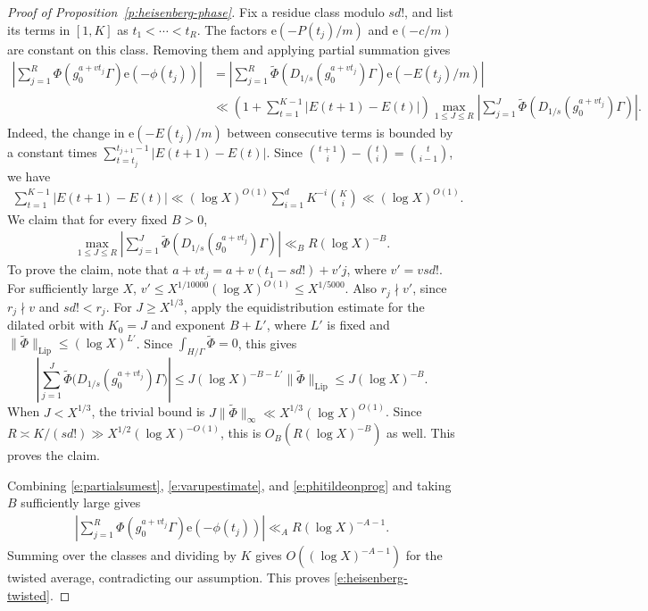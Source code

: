 \documentclass[12pt]{amsart}
\newcommand{\1}{\mathbf 1}
\newcommand{\e}{\mathrm e}
\theoremstyle{definition}
\begin{document}
\begin{proof}[Proof of Proposition~\ref{p:heisenberg-phase}]
Fix a residue class modulo \(sd!\), and list its terms in
\([1,K]\) as \(t_1<\cdots<t_R\). The factors \(\e(-P(t_j)/m)\)
and \(\e(-c/m)\) are constant on this class. Removing them and
applying partial summation gives
\begin{align}\label{e:partialsumest}
 \left|\sum_{j=1}^R
   \Phi(g_0^{a+vt_j}\Gamma)\e(-\phi(t_j))\right|
 &=\left|\sum_{j=1}^R
   \widetilde\Phi(D_{1/s}(g_0^{a+vt_j})\Gamma)
   \e(-E(t_j)/m)\right|\\
 &\ll
 \left(1+\sum_{t=1}^{K-1}|E(t+1)-E(t)|\right)
 \max_{1\leq J\leq R}
 \left|\sum_{j=1}^J
   \widetilde\Phi(D_{1/s}(g_0^{a+vt_j})\Gamma)\right|\nonumber.
\end{align}
Indeed, the change in \(\e(-E(t_j)/m)\) between consecutive terms
is bounded by a constant times
\(\sum_{t=t_j}^{t_{j+1}-1}|E(t+1)-E(t)|\). Since
\(\binom{t+1}{i}-\binom{t}{i}=\binom{t}{i-1}\), we have
\begin{align}\label{e:varupestimate}
    \sum_{t=1}^{K-1}|E(t+1)-E(t)|
 \ll (\log X)^{O(1)}\sum_{i=1}^d K^{-i}\binom{K}{i}
 \ll(\log X)^{O(1)}.
\end{align}
We claim that for every fixed \(B>0\),
\begin{align}\label{e:phitildeonprog}
    \max_{1\leq J\leq R}
 \left|\sum_{j=1}^J
   \widetilde\Phi(D_{1/s}(g_0^{a+vt_j})\Gamma)\right|
 \ll_B R(\log X)^{-B}.
\end{align}
To prove the claim, note that \(a+vt_j=a+v(t_1-sd!)+v'j\),
where \(v'=vsd!\). For sufficiently large \(X\),
\(v'\leq X^{1/10000}(\log X)^{O(1)}\leq X^{1/5000}\).
Also \(r_j\nmid v'\), since \(r_j\nmid v\) and \(sd!<r_j\).
For \(J\geq X^{1/3}\), apply the equidistribution estimate for
the dilated orbit with \(K_0=J\) and exponent \(B+L'\), where
\(L'\) is fixed and
\(\|\widetilde\Phi\|_{\mathrm{Lip}}\leq(\log X)^{L'}\).
Since \(\int_{H/\Gamma}\widetilde\Phi=0\), this gives
\[
 \left|\sum_{j=1}^J
 \widetilde\Phi\bigl(D_{1/s}(g_0^{a+vt_j})\Gamma\bigr)\right|
 \leq J(\log X)^{-B-L'}\|\widetilde\Phi\|_{\mathrm{Lip}}
 \leq J(\log X)^{-B}.
\]
When \(J<X^{1/3}\), the trivial bound is
\(J\|\widetilde\Phi\|_\infty\ll X^{1/3}(\log X)^{O(1)}\).
Since \(R\asymp K/(sd!)\gg X^{1/2}(\log X)^{-O(1)}\), this is
\(O_B(R(\log X)^{-B})\) as well. This proves the claim.

Combining \eqref{e:partialsumest}, \eqref{e:varupestimate}, and \eqref{e:phitildeonprog}
and taking $B$ sufficiently large gives
\begin{align*}
    \left|\sum_{j=1}^R
   \Phi(g_0^{a+vt_j}\Gamma)\e(-\phi(t_j))\right| \ll_A R(\log X)^{-A-1}.
\end{align*}
Summing over the classes and dividing
by \(K\) gives \(O((\log X)^{-A-1})\) for the twisted average,
contradicting our assumption. This proves
\eqref{e:heisenberg-twisted}.


\end{proof}
\end{document}
